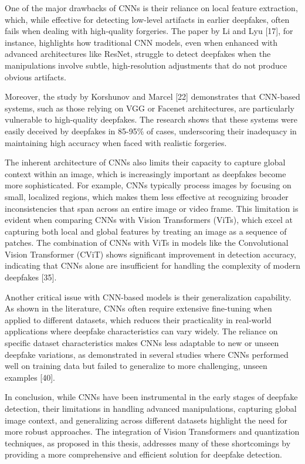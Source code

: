 \documentclass[conference]{IEEEtran}
\begin{document}
		One of the major drawbacks of CNNs is their reliance on local feature extraction, which, while effective for detecting low-level artifacts in earlier deepfakes, often fails when dealing with high-quality forgeries. The paper by Li and Lyu [17], for instance, highlights how traditional CNN models, even when enhanced with advanced architectures like ResNet, struggle to detect deepfakes when the manipulations involve subtle, high-resolution adjustments that do not produce obvious artifacts.
		
		Moreover, the study by Korshunov and Marcel [22] demonstrates that CNN-based systems, such as those relying on VGG or Facenet architectures, are particularly vulnerable to high-quality deepfakes. The research shows that these systems were easily deceived by deepfakes in 85-95\% of cases, underscoring their inadequacy in maintaining high accuracy when faced with realistic forgeries.
		
		The inherent architecture of CNNs also limits their capacity to capture global context within an image, which is increasingly important as deepfakes become more sophisticated. For example, CNNs typically process images by focusing on small, localized regions, which makes them less effective at recognizing broader inconsistencies that span across an entire image or video frame. This limitation is evident when comparing CNNs with Vision Transformers (ViTs), which excel at capturing both local and global features by treating an image as a sequence of patches. The combination of CNNs with ViTs in models like the Convolutional Vision Transformer (CViT) shows significant improvement in detection accuracy, indicating that CNNs alone are insufficient for handling the complexity of modern deepfakes [35].
		
		Another critical issue with CNN-based models is their generalization capability. As shown in the literature, CNNs often require extensive fine-tuning when applied to different datasets, which reduces their practicality in real-world applications where deepfake characteristics can vary widely. The reliance on specific dataset characteristics makes CNNs less adaptable to new or unseen deepfake variations, as demonstrated in several studies where CNNs performed well on training data but failed to generalize to more challenging, unseen examples [40].
		
		In conclusion, while CNNs have been instrumental in the early stages of deepfake detection, their limitations in handling advanced manipulations, capturing global image context, and generalizing across different datasets highlight the need for more robust approaches. The integration of Vision Transformers and quantization techniques, as proposed in this thesis, addresses many of these shortcomings by providing a more comprehensive and efficient solution for deepfake detection.
		
\end{document}
